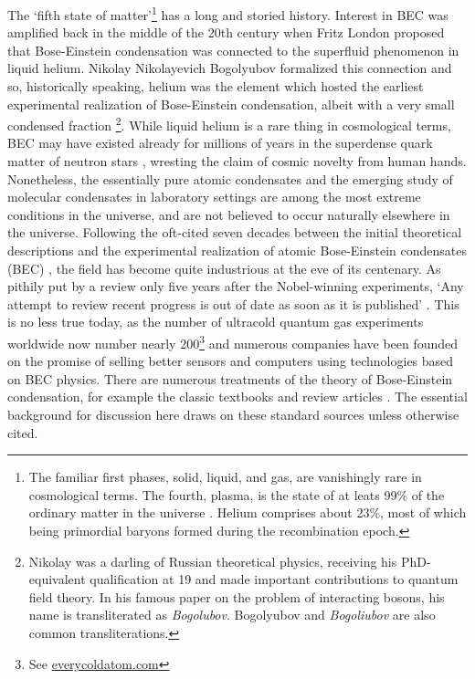 	The `fifth state of matter'\footnote{The familiar first phases, solid, liquid, and gas, are vanishingly rare in cosmological terms.
	The fourth, plasma, is the state of at leats 99\% of the ordinary matter in the universe \cite{Plasmastuff}.
	Helium comprises about 23\%, most of which being primordial baryons formed during the recombination epoch.}  has a long and storied history\cite{Mukundanote}.
	Interest in BEC was amplified back in the middle of the 20th century when Fritz London proposed that Bose-Einstein condensation was connected to the superfluid phenomenon in liquid helium.
	Nikolay Nikolayevich Bogolyubov formalized this connection and so, historically speaking, helium was the element which hosted the earliest experimental realization of Bose-Einstein condensation, albeit with a very small condensed fraction \footnote{Nikolay was a darling of Russian theoretical physics, receiving his PhD-equivalent qualification at 19 and made important contributions to quantum field theory. In his famous paper on the problem of interacting bosons, his name is transliterated as \emph{Bogolubov}. Bogolyubov and \emph{Bogoliubov} are also common transliterations.}.
	While liquid helium is a rare thing in cosmological terms, BEC may have existed already for millions of years in the superdense quark matter of neutron stars \cite{Haskell18, martin16,Baym69,Page11}, wresting the claim of cosmic novelty from human hands. 
	Nonetheless, the essentially pure atomic condensates and the emerging study of molecular condensates in laboratory settings are among the most extreme conditions in the universe, and are not believed to occur naturally elsewhere in the universe.
	Following the oft-cited seven decades between the initial theoretical descriptions and the experimental realization of atomic Bose-Einstein condensates (BEC) \cite{Anderson95,Davis95,Bradley95}, the field has become quite industrious at the eve of its centenary.
	As pithily put by a review only five years after the Nobel-winning experiments, `Any attempt to review recent progress is out of date as soon as it is published' \cite{Courteille01}.
	This is no less true today, as the number of ultracold quantum gas experiments worldwide now number nearly 200\footnote{See \url{everycoldatom.com}} and numerous companies have been founded on the promise of selling better sensors and computers using technologies based on BEC physics.
	There are numerous treatments of the theory of Bose-Einstein condensation, for example the classic textbooks \cite{PitaevskiiStringari,PethickSmith} and review articles \cite{DalfovoReview, yukalov11_basics,Courteille01}.
	The essential background for discussion here draws on these standard sources unless otherwise cited.


